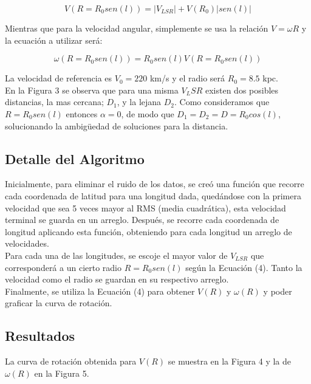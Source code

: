 \documentclass[letterpaper,oneside]{article}
\begin{document}
\begin{equation}
  V ( R=R_0 sen(l)) =   |V_{LSR}| + V(R_0) |sen(l)| 
\end{equation}

Mientras que para la velocidad angular, simplemente se usa la relación $V=\omega R$ y la ecuación a utilizar será:

\begin{equation}
  \omega ( R=R_0 sen(l)) =  R_0 sen(l)  V ( R=R_0 sen(l))
\end{equation}

La velocidad de referencia es $V_0 = 220$ km/s y el radio será $R_0 = 8.5$ kpc.\\

En la Figura 3 se observa que para una misma $V_LSR$ existen dos posibles distancias, la mas cercana;  $D_{1}$, y la lejana $D_{2}$. Como consideramos que $R=R_0 sen(l)$ entonces $\alpha=0$, de modo que $D_{1}=D_{2}=D=R_0cos(l)$, solucionando la ambigüedad de soluciones para la distancia. 

\subsection{Detalle del Algoritmo}
Inicialmente, para eliminar el ruido de los datos, se creó una función que recorre cada coordenada de latitud para una longitud dada, quedándose con la primera velocidad que sea 5 veces mayor al RMS (media cuadrática), esta velocidad terminal se guarda en un arreglo. Después, se recorre cada coordenada de longitud aplicando esta función, obteniendo para cada longitud un arreglo de velocidades.\\

Para cada una de las longitudes, se escoje el mayor valor de $V_{LSR}$ que corresponderá a un cierto radio $R=R_0 sen(l)$ según la Ecuación (4). Tanto la velocidad como el radio se guardan en su respectivo arreglo.\\

Finalmente, se utiliza la Ecuación (4) para obtener $V(R)$ y $\omega (R)$ y poder graficar la curva de rotación.

\subsection{Resultados}
La curva de rotación obtenida para $V(R)$ se muestra en la Figura 4 y la de $\omega (R)$ en la Figura 5. 
\end{document}
